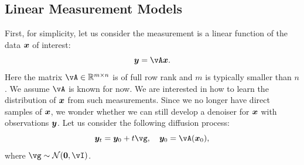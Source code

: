 \documentclass[../../book-main.tex]{subfiles}
\begin{document}


\subsection{Linear Measurement Models}
First, for simplicity, let us consider the measurement is a linear function of the data $\bm{x}$ of interest:
\begin{equation}
    \y = \vA\x.
\end{equation}
Here the matrix $\vA \in \mathbb{R}^{m\times n}$ is of full row rank and $m$ is typically smaller than $n$. We assume $\vA$ is known for now. We are interested in how to learn the distribution of $\bm{x}$ from such measurements. Since we no longer have direct samples of $\bm{x}$, we wonder whether we can still develop a denoiser for $\bm{x}$ with observations $\bm{y}$. Let us consider the following diffusion process:
\begin{equation}
    \y_t = \y_0 + t \vg, \quad \y_0 = \vA(\x_0), 
\end{equation}
where $\vg \sim \mathcal{N}(\boldsymbol{0}, \vI)$. 
\end{document}
